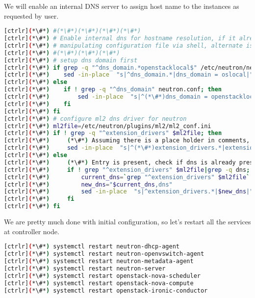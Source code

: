 	We will enable an internal DNS server to assign host name to the instances as requested by user. 


\begin{lstlisting}[language=bash,keywords={}]
[ctrlr](*\#*) #(*\#*)(*\#*)(*\#*)(*\#*)
[ctrlr](*\#*) # Enable internal dns for hostname resolution, if it already not set
[ctrlr](*\#*) # manipulating configuration file via shell, alternate is to use openstack-config (TODO)
[ctrlr](*\#*) #(*\#*)(*\#*)(*\#*)
[ctrlr](*\#*) # setup dns domain first
[ctrlr](*\#*) if grep -q "^dns_domain.*openstacklocal$" /etc/neutron/neutron.conf; then
[ctrlr](*\#*)    sed -in-place  "s|^dns_domain.*|dns_domain = oslocal|" /etc/neutron/neutron.conf
[ctrlr](*\#*) else
[ctrlr](*\#*)    if ! grep -q "^dns_domain" neutron.conf; then
[ctrlr](*\#*)        sed -in-place  "s|^(*\#*)dns_domain = openstacklocal$|dns_domain = oslocal|" /etc/neutron/neutron.conf
[ctrlr](*\#*)    fi
[ctrlr](*\#*) fi
[ctrlr](*\#*) # configure ml2 dns driver for neutron
[ctrlr](*\#*) ml2file=/etc/neutron/plugins/ml2/ml2_conf.ini
[ctrlr](*\#*) if ! grep -q "^extension_drivers" $ml2file; then
[ctrlr](*\#*)     (*\#*) Assuming there is a place holder in comments, replace that string
[ctrlr](*\#*)     sed -in-place  "s|^(*\#*)extension_drivers.*|extension_drivers = port_security,dns|" $ml2file
[ctrlr](*\#*) else
[ctrlr](*\#*)     (*\#*) Entry is present, check if dns is already present, if not then enable
[ctrlr](*\#*)     if ! grep "^extension_drivers" $ml2file|grep -q dns; then
[ctrlr](*\#*)         current_dns=`grep "^extension_drivers" $ml2file`
[ctrlr](*\#*)         new_dns="$current_dns,dns"
[ctrlr](*\#*)         sed -in-place  "s|^extension_drivers.*|$new_dns|" $ml2file
[ctrlr](*\#*)     fi
[ctrlr](*\#*) fi
\end{lstlisting} 

	We are pretty much done with initial configuration, so let's restart all the services at controller node.


\begin{lstlisting}[language=bash,keywords={}]
[ctrlr](*\#*) systemctl restart neutron-dhcp-agent
[ctrlr](*\#*) systemctl restart neutron-openvswitch-agent
[ctrlr](*\#*) systemctl restart neutron-metadata-agent
[ctrlr](*\#*) systemctl restart neutron-server
[ctrlr](*\#*) systemctl restart openstack-nova-scheduler
[ctrlr](*\#*) systemctl restart openstack-nova-compute
[ctrlr](*\#*) systemctl restart openstack-ironic-conductor
\end{lstlisting} 
